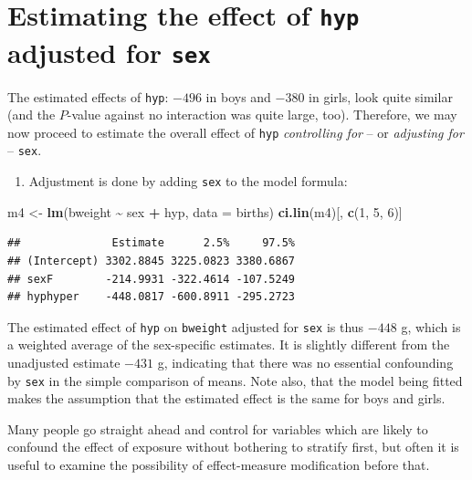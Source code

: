 \documentclass[
]{book}
\newenvironment{Shaded}{\begin{snugshade}}{\end{snugshade}}
\newcommand{\AttributeTok}[1]{\textcolor[rgb]{0.13,0.29,0.53}{#1}}
\newcommand{\DecValTok}[1]{\textcolor[rgb]{0.00,0.00,0.81}{#1}}
\newcommand{\FunctionTok}[1]{\textcolor[rgb]{0.13,0.29,0.53}{\textbf{#1}}}
\newcommand{\NormalTok}[1]{#1}
\newcommand{\OtherTok}[1]{\textcolor[rgb]{0.56,0.35,0.01}{#1}}
\newcommand{\SpecialCharTok}[1]{\textcolor[rgb]{0.81,0.36,0.00}{\textbf{#1}}}
\providecommand{\tightlist}{%
  \setlength{\itemsep}{0pt}\setlength{\parskip}{0pt}}
\begin{document}
\section{\texorpdfstring{Estimating the effect of \texttt{hyp} adjusted for \texttt{sex}}{Estimating the effect of hyp adjusted for sex}}\label{estimating-the-effect-of-hyp-adjusted-for-sex}

The estimated effects of \texttt{hyp}:
\(-496\) in boys and \(-380\) in girls, look quite
similar (and the \(P\)-value against no interaction was quite large, too).
Therefore, we may now proceed to estimate the overall effect of \texttt{hyp}
\emph{controlling for} -- or \emph{adjusting for} -- \texttt{sex}.

\begin{enumerate}
\def\labelenumi{\arabic{enumi}.}
\tightlist
\item
  Adjustment is done by adding \texttt{sex} to the model formula:
\end{enumerate}

\begin{Shaded}
\begin{Highlighting}[]
\NormalTok{m4 }\OtherTok{\textless{}{-}} \FunctionTok{lm}\NormalTok{(bweight }\SpecialCharTok{\textasciitilde{}}\NormalTok{ sex }\SpecialCharTok{+}\NormalTok{ hyp, }\AttributeTok{data =}\NormalTok{ births)}
\FunctionTok{ci.lin}\NormalTok{(m4)[, }\FunctionTok{c}\NormalTok{(}\DecValTok{1}\NormalTok{, }\DecValTok{5}\NormalTok{, }\DecValTok{6}\NormalTok{)]}
\end{Highlighting}
\end{Shaded}

\begin{verbatim}
##              Estimate      2.5%     97.5%
## (Intercept) 3302.8845 3225.0823 3380.6867
## sexF        -214.9931 -322.4614 -107.5249
## hyphyper    -448.0817 -600.8911 -295.2723
\end{verbatim}

The estimated effect of \texttt{hyp} on \texttt{bweight}
adjusted for \texttt{sex} is thus \(-448\) g,
which is a weighted average of the sex-specific estimates.
It is slightly different from the unadjusted estimate \(-431\) g, indicating
that there was no essential confounding by \texttt{sex} in the
simple comparison of means.
Note also, that the model being fitted makes the assumption that
the estimated effect is the same for boys and girls.

Many people go straight ahead and control for variables which are likely to
confound the effect of exposure without bothering to stratify first,
but often it is useful to examine the possibility of effect-measure
modification before that.
\end{document}
